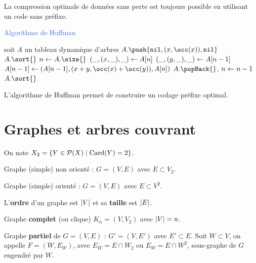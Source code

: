 \documentclass[a4paper,11pt,twocolumn]{article}
\begin{document}
	\begin{thm}
	La compression optimale de données sans perte est toujours possible en utilisant un code sans préfixe.
	\end{thm}


	\begin{algorithm}
	\caption{\textcolor{RoyalBlue}{Algorithme de Huffman}}
	soit $A$ un tableau dynamique d'arbres \;
	{
		$A.\push{\texttt{nil},(x,\occ(x)),\texttt{nil}}$\;
	}
	$A.\sort{}$ \;
	$n \lar A.\size{}$ \;
	{
		$(\_,(x,\_),\_) \leftarrow A[n]$ \;
		$(\_,(y,\_),\_) \leftarrow A[n - 1]$ \;
		$A[n - 1] \lar (A[n - 1],(x + y, \occ(x) + \occ(y)), A[n])$ \;
		$A.\popBack{}$, $n \leftarrow n - 1$ \;
		$A.\sort{}$ \;
	}
	\end{algorithm}

	\begin{thm}
	L'algorithme de Huffman permet de construire un codage préfixe optimal.
	\end{thm}


\section{Graphes et arbres couvrant}

	On note $X_2 = \{ Y \in \mathcal{P}(X) \mid \operatorname{Card}(Y) = 2 \}$.

	\begin{defn}
	Graphe (simple) non orienté : $G = (V,E)$ avec $E \subset V_2$.
	\end{defn}

	\begin{defn}
	Graphe (simple) orienté : $G = (V,E)$ avec $E \subset V^2$.
	\end{defn}

	\begin{defn}
	L'\textbf{ordre} d'un graphe est $\left\lvert V\right\rvert$ et sa \textbf{taille} est $\left\lvert E\right\rvert$.
	\end{defn}

	\begin{defn}
	Graphe \textbf{complet} (ou clique) $K_n = (V,V_2)$ avec $\left\lvert V\right\rvert = n$.
	\end{defn}

	\begin{defn}
	Graphe \textbf{partiel} de $G = (V,E)$ : $G' = (V,E')$ avec $E' \subset E$.
	Soit $W \subset V$, on appelle $F = (W,E_W)$, avec $E_W = E \cap W_2$ ou $E_W = E \cap W^2$, sous-graphe de $G$ engendré par $W$.
	\end{defn}
\end{document}
